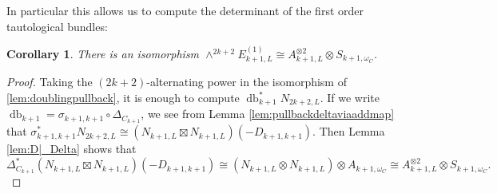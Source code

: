 \documentclass[12pt]{amsart}
\newcounter{thmcounter}
\numberwithin{equation}{section}
\numberwithin{thmcounter}{section}
\newtheorem{corollary}[thmcounter]{Corollary}
\theoremstyle{definition}
\theoremstyle{claim}
\begin{document}
In particular this allows us to compute the determinant of the first order tautological bundles:

\begin{corollary}
	There is an isomorphism $\wedge^{2k+2} E^{(1)}_{k+1,L} \cong A_{k+1,L}^{\otimes 2}\otimes S_{k+1,\omega_C}$.
\end{corollary}
\begin{proof}
	Taking the $(2k+2)$-alternating power in the isomorphism of  \ref{lem:doublingpullback}, it is enough to compute $ \operatorname{db}_{k+1}^*N_{2k+2,L}$. If we write $\operatorname{db}_{k+1} = \sigma_{k+1,k+1}\circ \Delta_{C_{k+1}}$, we see from Lemma \ref{lem:pullbackdeltaviaaddmap} that $\sigma_{k+1,k+1}^*N_{2k+2,L} \cong (N_{k+1,L}\boxtimes N_{k+1,L})(-D_{k+1,k+1})$. Then Lemma \ref{lem:D|_Delta} shows that
	\[\Delta_{C_{k+1}}^* (N_{k+1,L}\boxtimes N_{k+1,L})(-D_{k+1,k+1}) \cong (N_{k+1,L}\otimes N_{k+1,L})\otimes A_{k+1,\omega_C} \cong A_{k+1,L}^{\otimes 2} \otimes S_{k+1, \omega_C}. \] \qedhere
\end{proof}
\end{document}
